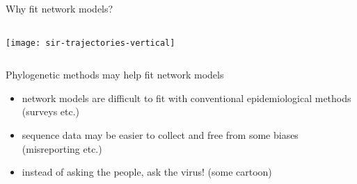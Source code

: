 \documentclass{beamer}
\begin{document}
\begin{frame}{Why fit network models?}
  \begin{columns}
    \texttt{[image: sir-trajectories-vertical]}


  \end{columns}

  \vspace{-0.5cm}

  \begin{columns}


  \end{columns}
\end{frame}

\begin{frame}{Phylogenetic methods may help fit network models}
  \begin{itemize}
    \item network models are difficult to fit with conventional epidemiological
      methods (surveys etc.)
    \item sequence data may be easier to collect and free from some biases
      (misreporting etc.)
    \item instead of asking the people, ask the virus! (some cartoon)
  \end{itemize}
\end{frame}
\end{document}
